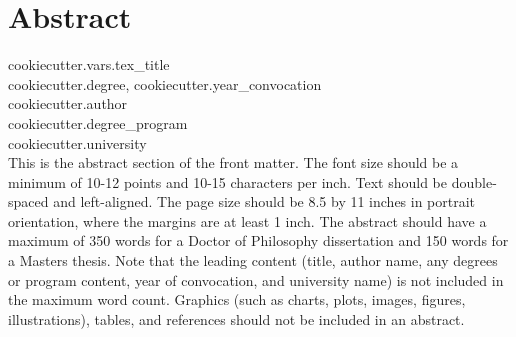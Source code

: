 

\chapter*{Abstract} \label{abstract}

{{cookiecutter.vars.tex_title}} \\
{{cookiecutter.degree}}, {{cookiecutter.year_convocation}} \\
{{cookiecutter.author}} \\
{{cookiecutter.degree_program}} \\
{{cookiecutter.university}} \\

This is the abstract section of the front matter. The font size should be a minimum of 10-12 points and 10-15 characters per inch. Text should be double-spaced and left-aligned. The page size should be 8.5 by 11 inches in portrait orientation, where the margins are at least 1 inch. The abstract should have a maximum of 350 words for a Doctor of Philosophy dissertation and 150 words for a Masters thesis. Note that the leading content (title, author name, any degrees or program content, year of convocation, and university name) is not included in the maximum word count. Graphics (such as charts, plots, images, figures, illustrations), tables, and references should not be included in an abstract. 
